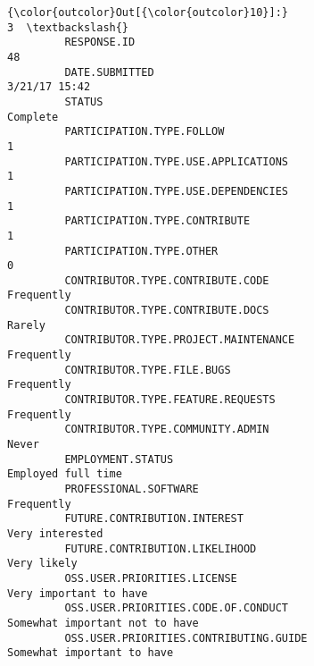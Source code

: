\documentclass[11pt]{article}
\begin{document}
            \begin{Verbatim}[commandchars=\\\{\}]
{\color{outcolor}Out[{\color{outcolor}10}]:}                                                                                                    3  \textbackslash{}
         RESPONSE.ID                                                                                       48   
         DATE.SUBMITTED                                                                         3/21/17 15:42   
         STATUS                                                                                      Complete   
         PARTICIPATION.TYPE.FOLLOW                                                                          1   
         PARTICIPATION.TYPE.USE.APPLICATIONS                                                                1   
         PARTICIPATION.TYPE.USE.DEPENDENCIES                                                                1   
         PARTICIPATION.TYPE.CONTRIBUTE                                                                      1   
         PARTICIPATION.TYPE.OTHER                                                                           0   
         CONTRIBUTOR.TYPE.CONTRIBUTE.CODE                                                          Frequently   
         CONTRIBUTOR.TYPE.CONTRIBUTE.DOCS                                                              Rarely   
         CONTRIBUTOR.TYPE.PROJECT.MAINTENANCE                                                      Frequently   
         CONTRIBUTOR.TYPE.FILE.BUGS                                                                Frequently   
         CONTRIBUTOR.TYPE.FEATURE.REQUESTS                                                         Frequently   
         CONTRIBUTOR.TYPE.COMMUNITY.ADMIN                                                               Never   
         EMPLOYMENT.STATUS                                                                 Employed full time   
         PROFESSIONAL.SOFTWARE                                                                     Frequently   
         FUTURE.CONTRIBUTION.INTEREST                                                         Very interested   
         FUTURE.CONTRIBUTION.LIKELIHOOD                                                           Very likely   
         OSS.USER.PRIORITIES.LICENSE                                                   Very important to have   
         OSS.USER.PRIORITIES.CODE.OF.CONDUCT                                   Somewhat important not to have   
         OSS.USER.PRIORITIES.CONTRIBUTING.GUIDE                                    Somewhat important to have   

\end{Verbatim}
\end{document}
